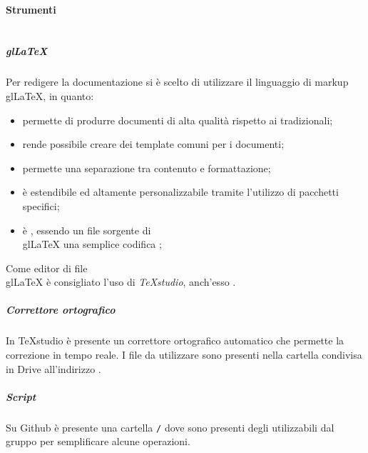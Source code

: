 \paragraph{Strumenti}
	\subparagraph{\\gl{LaTeX}}
	Per redigere la documentazione si è scelto di utilizzare il linguaggio di markup \\gl{LaTeX}, in quanto: \\
	\begin{itemize} 
		\item permette di produrre documenti di alta qualità rispetto ai  tradizionali; 
		\item rende possibile creare dei template comuni per i documenti;
		\item permette una separazione tra contenuto e formattazione;
		\item è estendibile ed altamente personalizzabile tramite l'utilizzo di pacchetti specifici;
		\item è , essendo un file sorgente di \\gl{LaTeX} una semplice codifica ;
		\end{itemize}
		Come editor di file \\gl{LaTeX} è consigliato l'uso di \textit{TeXstudio}, anch'esso .	
	\subparagraph{Correttore ortografico}
	In TeXstudio è presente un correttore ortografico automatico che permette la correzione in tempo reale. I file da utilizzare sono presenti nella cartella condivisa in  Drive all'indirizzo .
	\subparagraph{Script}
		Su Github è presente una cartella \texttt{/} dove sono presenti degli  utilizzabili dal gruppo per semplificare alcune operazioni.